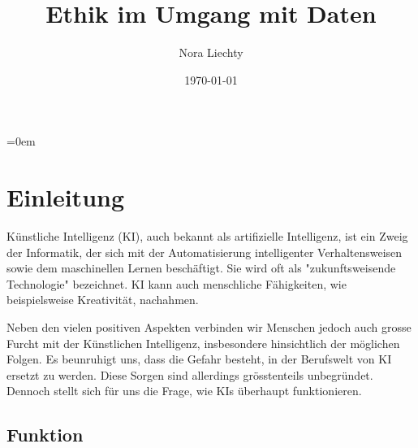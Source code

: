 \documentclass{report}
\title{Ethik im Umgang mit Daten}
\author{Nora Liechty}
\date{\today}
\begin{document}
\maketitle


\tableofcontents

\parindent=0em 

\chapter{Einleitung}

Künstliche Intelligenz (KI), auch bekannt als artifizielle Intelligenz, ist ein Zweig der Informatik, der sich mit der Automatisierung intelligenter Verhaltensweisen sowie dem maschinellen Lernen beschäftigt. Sie wird oft als "zukunftsweisende Technologie" bezeichnet. KI kann auch menschliche Fähigkeiten, wie beispielsweise Kreativität, nachahmen.

Neben den vielen positiven Aspekten verbinden wir Menschen jedoch auch grosse Furcht mit der Künstlichen Intelligenz, insbesondere hinsichtlich der möglichen Folgen. Es beunruhigt uns, dass die Gefahr besteht, in der Berufswelt von KI ersetzt zu werden. Diese Sorgen sind allerdings grösstenteils unbegründet.
Dennoch stellt sich für uns die Frage, wie KIs überhaupt funktionieren. 

\section{Funktion}
\end{document}
